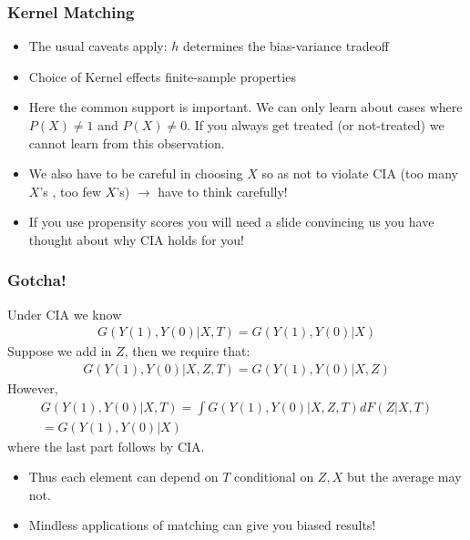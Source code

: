 \documentclass[xcolor=pdftex,dvipsnames,table,mathserif]{beamer}
\begin{document}
\begin{frame}
\frametitle{Kernel Matching}
\begin{itemize}
\item The usual caveats apply: $h$ determines the \alert{bias-variance} tradeoff
\item Choice of Kernel effects finite-sample properties
\item Here the \alert{common support} is important. We can only learn about cases where $P(X) \neq 1$ and $P(X) \neq 0$. If you always get treated (or not-treated) we cannot learn from this observation.
\item We also have to be careful in choosing $X$ so as not to violate CIA (too many $X$'s , too few $X$'s) $\rightarrow$ have to think carefully!
\item If you use propensity scores you will need a slide convincing us you have thought about why CIA holds for you!
\end{itemize}
\end{frame}



\begin{frame}
\frametitle{Gotcha!}
Under CIA we know
\begin{eqnarray*}
G(Y(1),Y(0) | X, T) = G(Y(1),Y(0) | X)
\end{eqnarray*}
Suppose we add in $Z$, then we require that:
\begin{eqnarray*}
G(Y(1),Y(0) | X, Z, T) = G(Y(1),Y(0) | X, Z)
\end{eqnarray*}
However,
\begin{eqnarray*}
G(Y(1),Y(0) | X, T) = \int G(Y(1),Y(0) | X, Z, T) dF(Z | X,T) \\
= G(Y(1),Y(0) | X)
\end{eqnarray*}
where the last part follows by CIA.
\begin{itemize}
\item Thus each element can depend on $T$ conditional on $Z,X$ but the average may not.
\item Mindless applications of matching can give you biased results!
\end{itemize}
\end{frame}
\end{document}
